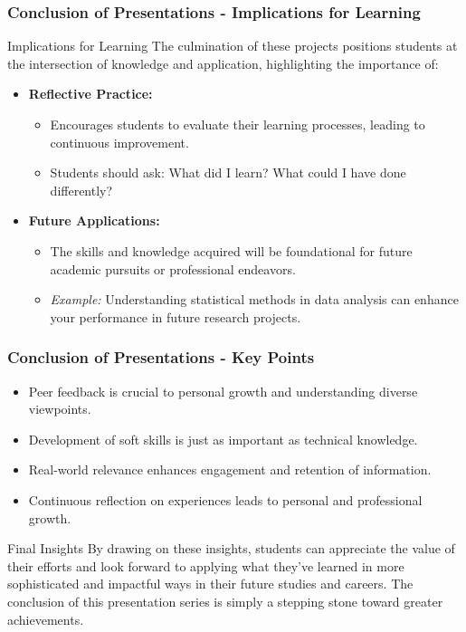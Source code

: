 \documentclass[aspectratio=169]{beamer}
\begin{document}
\begin{frame}[fragile]
  \frametitle{Conclusion of Presentations - Implications for Learning}
  \begin{block}{Implications for Learning}
    The culmination of these projects positions students at the intersection of knowledge and application, highlighting the importance of:
  \end{block}
  \begin{itemize}
    \item \textbf{Reflective Practice:}
      \begin{itemize}
        \item Encourages students to evaluate their learning processes, leading to continuous improvement.
        \item Students should ask: What did I learn? What could I have done differently?
      \end{itemize}
    \item \textbf{Future Applications:}
      \begin{itemize}
        \item The skills and knowledge acquired will be foundational for future academic pursuits or professional endeavors.
        \item \textit{Example:} Understanding statistical methods in data analysis can enhance your performance in future research projects.
      \end{itemize}
  \end{itemize}
\end{frame}

\begin{frame}[fragile]
  \frametitle{Conclusion of Presentations - Key Points}
  \begin{itemize}
    \item Peer feedback is crucial to personal growth and understanding diverse viewpoints.
    \item Development of soft skills is just as important as technical knowledge.
    \item Real-world relevance enhances engagement and retention of information.
    \item Continuous reflection on experiences leads to personal and professional growth.
  \end{itemize}
  
  \begin{block}{Final Insights}
    By drawing on these insights, students can appreciate the value of their efforts and look forward to applying what they’ve learned in more sophisticated and impactful ways in their future studies and careers. The conclusion of this presentation series is simply a stepping stone toward greater achievements.
  \end{block}
\end{frame}
\end{document}
